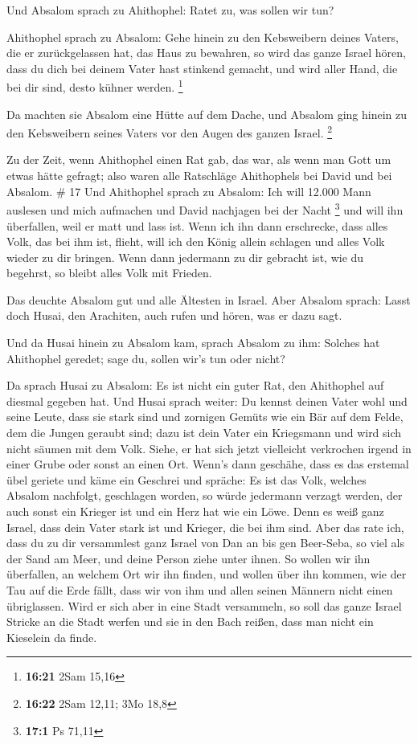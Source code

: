  Und Absalom sprach zu Ahithophel: Ratet zu, was sollen
wir tun?

 Ahithophel sprach zu Absalom: Gehe hinein zu den
Kebsweibern deines Vaters, die er zurückgelassen hat, das Haus zu
bewahren, so wird das ganze Israel hören, dass du dich bei deinem Vater
hast stinkend gemacht, und wird aller Hand, die bei dir sind, desto
kühner werden. \footnote{\textbf{16:21} 2Sam 15,16}

 Da machten sie Absalom eine Hütte auf dem Dache, und
Absalom ging hinein zu den Kebsweibern seines Vaters vor den Augen des
ganzen Israel. \footnote{\textbf{16:22} 2Sam 12,11; 3Mo 18,8}

 Zu der Zeit, wenn Ahithophel einen Rat gab, das war, als
wenn man Gott um etwas hätte gefragt; also waren alle Ratschläge
Ahithophels bei David und bei Absalom. \# 17  Und
Ahithophel sprach zu Absalom: Ich will 12.000 Mann auslesen und mich
aufmachen und David nachjagen bei der Nacht \footnote{\textbf{17:1} Ps
  71,11}  und will ihn überfallen, weil er matt und lass
ist. Wenn ich ihn dann erschrecke, dass alles Volk, das bei ihm ist,
flieht, will ich den König allein schlagen  und alles Volk
wieder zu dir bringen. Wenn dann jedermann zu dir gebracht ist, wie du
begehrst, so bleibt alles Volk mit Frieden.

 Das deuchte Absalom gut und alle Ältesten in Israel.
 Aber Absalom sprach: Lasst doch Husai, den Arachiten,
auch rufen und hören, was er dazu sagt.

 Und da Husai hinein zu Absalom kam, sprach Absalom zu
ihm: Solches hat Ahithophel geredet; sage du, sollen wir's tun oder
nicht?

 Da sprach Husai zu Absalom: Es ist nicht ein guter Rat,
den Ahithophel auf diesmal gegeben hat.  Und Husai sprach
weiter: Du kennst deinen Vater wohl und seine Leute, dass sie stark sind
und zornigen Gemüts wie ein Bär auf dem Felde, dem die Jungen geraubt
sind; dazu ist dein Vater ein Kriegsmann und wird sich nicht säumen mit
dem Volk.  Siehe, er hat sich jetzt vielleicht verkrochen
irgend in einer Grube oder sonst an einen Ort. Wenn's dann geschähe,
dass es das erstemal übel geriete und käme ein Geschrei und spräche: Es
ist das Volk, welches Absalom nachfolgt, geschlagen worden,
 so würde jedermann verzagt werden, der auch sonst ein
Krieger ist und ein Herz hat wie ein Löwe. Denn es weiß ganz Israel,
dass dein Vater stark ist und Krieger, die bei ihm sind. 
Aber das rate ich, dass du zu dir versammlest ganz Israel von Dan an bis
gen Beer-Seba, so viel als der Sand am Meer, und deine Person ziehe
unter ihnen.  So wollen wir ihn überfallen, an welchem
Ort wir ihn finden, und wollen über ihn kommen, wie der Tau auf die Erde
fällt, dass wir von ihm und allen seinen Männern nicht einen
übriglassen.  Wird er sich aber in eine Stadt versammeln,
so soll das ganze Israel Stricke an die Stadt werfen und sie in den Bach
reißen, dass man nicht ein Kieselein da finde.

